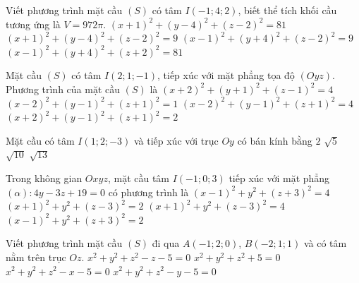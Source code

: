 
\begin{ex}%
	Viết phương trình mặt cầu $(S)$ có tâm $I(-1;4;2)$, biết thể tích khối cầu tương ứng là $V=972\pi$.
	\choice
	{\True $(x+1)^2+(y-4)^2+(z-2)^2=81$}
	{$(x+1)^2+(y-4)^2+(z-2)^2=9$}
	{$(x-1)^2+(y+4)^2+(z-2)^2=9$}
	{$(x-1)^2+(y+4)^2+(z+2)^2=81$}
\end{ex}
\begin{ex}%
	Mặt cầu $(S)$ có tâm $I(2; 1; -1)$, tiếp xúc với mặt phẳng tọa độ $(Oyz)$. Phương trình của mặt cầu $(S)$ là
	\choice
	{$(x+2)^2+(y+1)^2+(z-1)^2=4$}
	{$(x-2)^2+(y-1)^2+(z+1)^2=1$}
	{\True $(x-2)^2+(y-1)^2+(z+1)^2=4$}
	{$(x+2)^2+(y-1)^2+(z+1)^2=2$}
\end{ex}
\begin{ex}%
	Mặt cầu có tâm $I(1; 2; -3)$ và tiếp xúc với trục $Oy$ có bán kính bằng
	\choice
	{$2$}
	{$\sqrt{5}$}
	{\True $\sqrt{10}$}
	{$\sqrt{13}$}
\end{ex}
\begin{ex}
	Trong không gian $Oxyz$, mặt cầu tâm $I(-1;0;3)$ tiếp xúc với mặt phẳng $(\alpha) \colon 4y-3z+19=0$ có phương trình là
	\choice
	{$(x-1)^2+y^2+(z+3)^2=4$}
	{$(x+1)^2+y^2+(z-3)^2=2$}
	{\True $(x+1)^2+y^2+(z-3)^2=4$}
	{$(x-1)^2+y^2+(z+3)^2=2$}
\end{ex}
\begin{ex}%
	Viết phương trình mặt cầu $(S)$ đi qua $A(-1;2;0)$, $B(-2;1;1)$ và có tâm nằm trên trục $Oz$.
	\choice 
	{\True $x^2+y^2+z^2-z-5=0$}
	{$x^2+y^2+z^2+5=0$}
	{$x^2+y^2+z^2-x-5=0$}
	{$x^2+y^2+z^2-y-5=0$}  
\end{ex}

